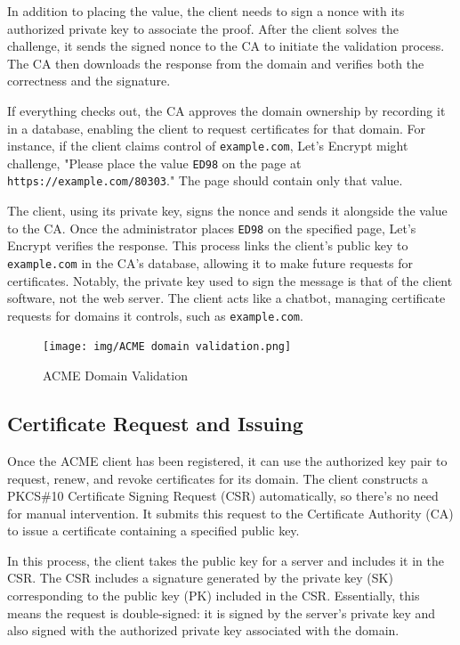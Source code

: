 In addition to placing the value, the client needs to sign a nonce
with its authorized private key to associate the proof. After the
client solves the challenge, it sends the signed nonce to the CA to
initiate the validation process. The CA then downloads the response
from the domain and verifies both the correctness and the signature.

If everything checks out, the CA approves the domain ownership by
recording it in a database, enabling the client to request
certificates for that domain. For instance, if the client claims
control of \texttt{example.com}, Let's Encrypt might challenge,
"Please place the value \texttt{ED98} on the page at
\texttt{https://example.com/80303}." The page should contain only that
value.

The client, using its private key, signs the nonce and sends it
alongside the value to the CA. Once the administrator places
\texttt{ED98} on the specified page, Let's Encrypt verifies the
response. This process links the client's public key to
\texttt{example.com} in the CA's database, allowing it to make future
requests for certificates. Notably, the private key used to sign the
message is that of the client software, not the web server. The client
acts like a chatbot, managing certificate requests for domains it
controls, such as \texttt{example.com}.

\begin{figure}[H]
  \centering
  \texttt{[image: img/ACME domain
  validation.png]}
  \label{fig:acme}

  \caption{ACME Domain Validation}
\end{figure}

\subsection{Certificate Request and Issuing}

Once the ACME client has been registered, it can use the authorized
key pair to request, renew, and revoke certificates for its domain.
The client constructs a PKCS\#10 Certificate Signing Request (CSR)
automatically, so there's no need for manual intervention. It submits
this request to the Certificate Authority (CA) to issue a certificate
containing a specified public key. 

In this process, the client takes the public key for a server and
includes it in the CSR. The CSR includes a signature generated by the
private key (SK) corresponding to the public key (PK) included in the
CSR. Essentially, this means the request is double-signed: it is
signed by the server’s private key and also signed with the authorized
private key associated with the domain. 

